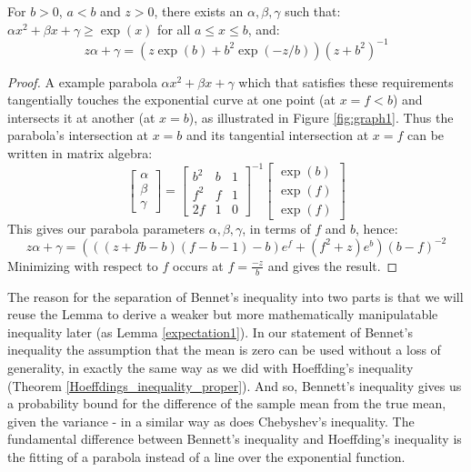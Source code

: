 \begin{lemma}\label{thm:parabola}
For $b>0$, $a<b$ and $z>0$, there exists an $\alpha,\beta,\gamma$ such that: $\alpha x^2+\beta x+\gamma\ge \exp(x)$ for all $a\le x\le b$, and:
$$z\alpha+\gamma = (z\exp(b) + b^2\exp(-z/b))(z + b^2)^{-1}$$
\end{lemma}
\begin{proof}
A example parabola $\alpha x^2+\beta x+\gamma$ which that satisfies these requirements tangentially touches the exponential curve at one point (at $x=f<b$) and intersects it at another (at $x=b$), as illustrated in Figure \ref{fig:graph1}.
Thus the parabola's intersection at $x=b$ and its tangential intersection at $x=f$ can be written in matrix algebra:
$$
\begin{bmatrix}
    \alpha \\
    \beta \\
	\gamma
\end{bmatrix}
=
\begin{bmatrix}
    b^2 & b & 1 \\
    f^2 & f & 1 \\
	2f  & 1 & 0
\end{bmatrix}^{-1}
\begin{bmatrix}
    \exp(b) \\
    \exp(f) \\
	\exp(f)
\end{bmatrix}$$
This gives our parabola parameters $\alpha,\beta,\gamma$, in terms of $f$ and $b$, hence:
$$z\alpha+\gamma = (((z+fb-b)(f-b-1)-b)e^f+(f^2+z)e^b)(b-f)^{-2}$$
Minimizing with respect to $f$ occurs at $f=\frac{-z}{b}$ and gives the result.
\end{proof}

The reason for the separation of Bennet's inequality into two parts is that we will reuse the Lemma to derive a weaker but more mathematically manipulatable inequality later (as Lemma \ref{expectation1}).
In our statement of Bennet's inequality the assumption that the mean is zero can be used without a loss of generality, in exactly the same way as we did with Hoeffding's inequality (Theorem \ref{Hoeffdings_inequality_proper}).
And so, Bennett's inequality gives us a probability bound for the difference of the sample mean from the true mean, given the variance - in a similar way as does Chebyshev's inequality.
The fundamental difference between Bennett's inequality and Hoeffding's inequality is the fitting of a parabola instead of a line over the exponential function.


